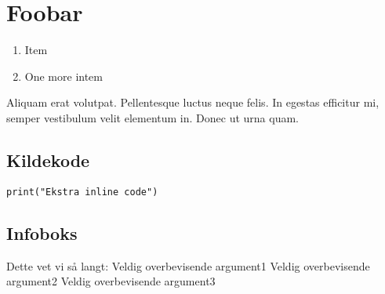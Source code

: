 \section{Foobar}
\begin{enumerate}
\item Item
\item One more intem
\end{enumerate}

Aliquam erat volutpat. Pellentesque luctus neque felis. In egestas efficitur mi, semper vestibulum velit elementum in. Donec ut urna quam.

\subsection{Kildekode}
\begin{lstlisting}[caption={Inline Programkode}, label=Kodesnutt_1, style=Python]
print("Ekstra inline code")
\end{lstlisting}




\subsection{Infoboks}
\begin{infoboks}{Dette vet vi så langt:}
Veldig overbevisende argument1
Veldig overbevisende argument2
Veldig overbevisende argument3
\end{infoboks}
